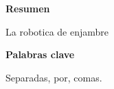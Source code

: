 
\newpage

\thispagestyle{empty}

\begin{center}

{\bf \Huge Resumen}

  \end{center}
\vspace{1cm}

La robotica de enjambre 

\vspace{1cm}


\begin{center}

{\bf \Large Palabras clave}

   \end{center}

   \vspace{0.5cm}
   
   Separadas, por, comas.
   



